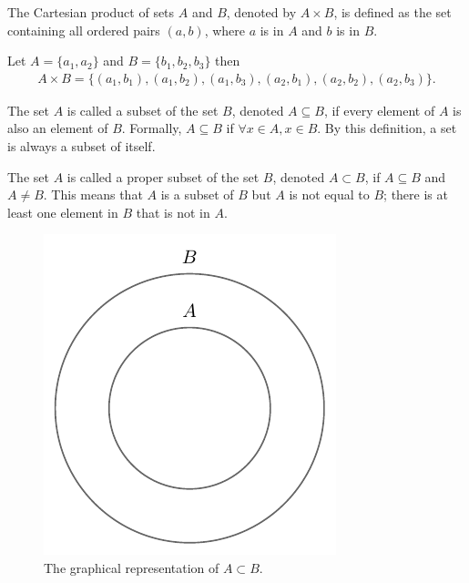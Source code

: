 \begin{definition}
	\label{def:cartesian_product}
	The Cartesian product of sets $A$ and $B$, denoted by $A \times B$, is defined as the set containing all ordered pairs $(a, b)$, where $a$ is in $A$ and $b$ is in $B$.
\end{definition}

\begin{example}
	Let $A = \{a_1, a_2\}$ and $B = \{b_1, b_2, b_3\}$ then
	\begin{equation}
		\begin{split}
			A\times B = \{(a_1,b_1),(a_1,b_2),(a_1,b_3),(a_2,b_1),(a_2,b_2),(a_2,b_3)\}.
		\end{split}
	\end{equation}
\end{example}

\begin{definition}[Subset]
	\label{def:subset}
	The set $A$ is called a subset of the set $B$, denoted $A \subseteq B$, if every element of $A$ is also an element of $B$. Formally, $A\subseteq B$ if $\forall x \in A, x \in B$. By this definition, a set is always a subset of itself.
\end{definition}

\begin{definition}
	\label{def:proper_subset}
	The set $A$ is called a proper subset of the set $B$, denoted $A \subset B$, if $A \subseteq B$ and $A \neq B$. This means that $A$ is a subset of $B$ but $A$ is not equal to $B$; there is at least one element in $B$ that is not in $A$.
	\begin{figure}[H]
		\centering
		\includegraphics[]{figures/set_subset.pdf}
		\caption{The graphical representation of $A\subset B$.}
		\label{fig:set_subset}
	\end{figure}
\end{definition}

